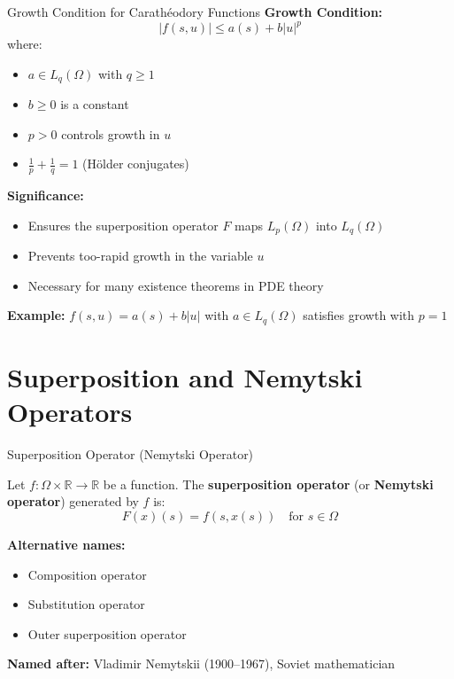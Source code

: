 \documentclass[aspectratio=169,10pt]{beamer}
\begin{document}
\begin{frame}{Growth Condition for Carathéodory Functions}
    \textbf{Growth Condition:}
    \[
        |f(s, u)| \leq a(s) + b|u|^p
    \]
    where:
    \begin{itemize}
        \item $a \in L_q(\Omega)$ with $q \geq 1$
        \item $b \geq 0$ is a constant
        \item $p > 0$ controls growth in $u$
        \item $\frac{1}{p} + \frac{1}{q} = 1$ (Hölder conjugates)
    \end{itemize}

    \vspace{0.3cm}
    \textbf{Significance:}
    \begin{itemize}
        \item Ensures the superposition operator $F$ maps $L_p(\Omega)$ into $L_q(\Omega)$
        \item Prevents too-rapid growth in the variable $u$
        \item Necessary for many existence theorems in PDE theory
    \end{itemize}

    \vspace{0.3cm}
    \textbf{Example:} $f(s, u) = a(s) + b|u|$ with $a \in L_q(\Omega)$ satisfies growth with $p=1$
\end{frame}

\section{Superposition and Nemytski Operators}

\begin{frame}{Superposition Operator (Nemytski Operator)}
    \begin{definition}
        Let $f: \Omega \times \mathbb{R} \to \mathbb{R}$ be a function. The \textbf{superposition operator} (or \textbf{Nemytski operator}) generated by $f$ is:
        \[
            F(x)(s) = f(s, x(s)) \quad \text{for } s \in \Omega
        \]
    \end{definition}

    \vspace{0.3cm}
    \textbf{Alternative names:}
    \begin{itemize}
        \item Composition operator
        \item Substitution operator
        \item Outer superposition operator
    \end{itemize}

    \vspace{0.3cm}
    \textbf{Named after:} Vladimir Nemytskii (1900--1967), Soviet mathematician
\end{frame}
\end{document}
